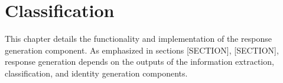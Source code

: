 \chapter{Classification}

This chapter details the functionality and implementation of the response generation component. As emphasized in sections [SECTION], [SECTION], response generation depends on the outputs of the information extraction, classification, and identity generation components. 

